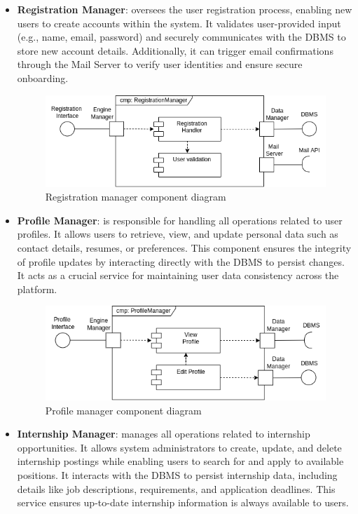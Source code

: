 \begin{itemize}
    \item \textbf{Registration Manager}: oversees the user registration process, enabling new users to create accounts within the system. It validates user-provided input (e.g., name, email, password) and securely communicates with the DBMS to store new account details. Additionally, it can trigger email confirmations through the Mail Server to verify user identities and ensure secure onboarding.

    \begin{figure}[H]
        \centering
        \includegraphics[width=0.9\linewidth]{Images/Component diagrams/ComponentDiagram_Registration.png}
        \caption{Registration manager component diagram}
        \label{fig:enter-label}
    \end{figure}
    
    \item \textbf{Profile Manager}: is responsible for handling all operations related to user profiles. It allows users to retrieve, view, and update personal data such as contact details, resumes, or preferences. This component ensures the integrity of profile updates by interacting directly with the DBMS to persist changes. It acts as a crucial service for maintaining user data consistency across the platform.

    \begin{figure}[H]
        \centering
        \includegraphics[width=0.9\linewidth]{Images/Component diagrams/ComponentDiagram_Profile.png}
        \caption{Profile manager component diagram}
        \label{fig:enter-label}
    \end{figure}
    
    \item \textbf{Internship Manager}: manages all operations related to internship opportunities. It allows system administrators to create, update, and delete internship postings while enabling users to search for and apply to available positions. It interacts with the DBMS to persist internship data, including details like job descriptions, requirements, and application deadlines. This service ensures up-to-date internship information is always available to users.


\end{itemize}
